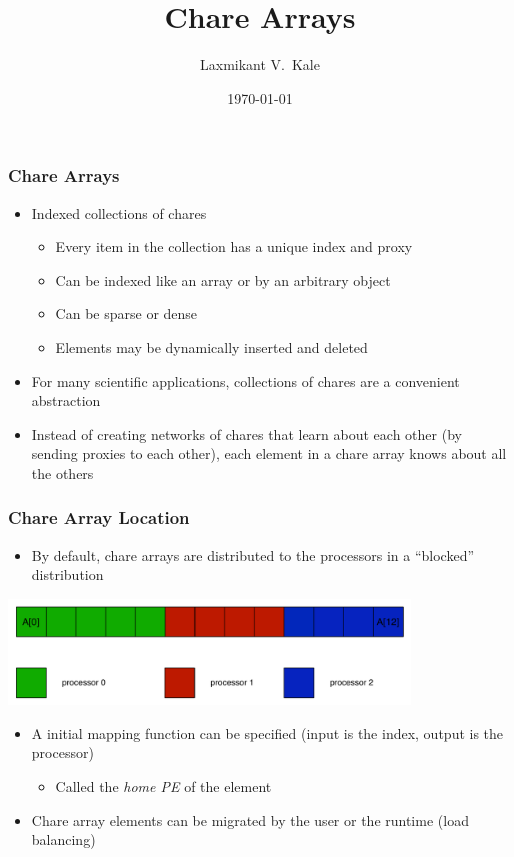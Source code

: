 \documentclass{beamer}
\title{Chare Arrays}
\author[Laxmikant V.~Kale]{
Laxmikant V.~Kale
}
\date{\today}
\begin{document}
\begin{frame}[fragile]
  \frametitle{Chare Arrays}
  \begin{itemize}
    \item Indexed collections of chares
      \begin{itemize}
      \item Every item in the collection has a unique index and proxy
      \item Can be indexed like an array or by an arbitrary object
      \item Can be sparse or dense
      \item Elements may be dynamically inserted and deleted
      \end{itemize}
    \item For many scientific applications, collections of chares are a
      convenient abstraction
    \item Instead of creating networks of chares that learn about each other
      (by sending proxies to each other), each element in a chare array knows
      about all the others
  \end{itemize}
\end{frame}

\begin{frame}
  \frametitle{Chare Array Location}
  \begin{itemize}
  \item By default, chare arrays are distributed to the processors in a
    ``blocked'' distribution
  \end{itemize}
  \begin{center} \includegraphics[width=0.8\textwidth]{figures/blockedDist.pdf} \end{center}
  \begin{itemize}
  \item A initial mapping function can be specified (input is the index, output
    is the processor)
    \begin{itemize}
    \item Called the \emph{home PE} of the element
    \end{itemize}
  \item Chare array elements can be migrated by the user or the runtime (load balancing)
  \end{itemize}
\end{frame}
\end{document}
